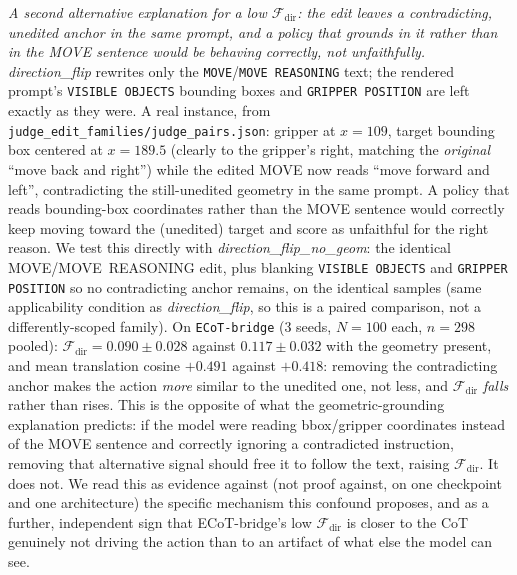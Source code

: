 \emph{A second alternative explanation for a low $\mathcal{F}_{\text{dir}}$: the edit leaves a contradicting, unedited anchor in the same prompt, and a policy that grounds in it rather than in the MOVE sentence would be behaving correctly, not unfaithfully.} \emph{direction\_flip} rewrites only the \texttt{MOVE}/\texttt{MOVE REASONING} text; the rendered prompt's \texttt{VISIBLE OBJECTS} bounding boxes and \texttt{GRIPPER POSITION} are left exactly as they were. A real instance, from \texttt{judge\_edit\_families/\allowbreak{}judge\_pairs.json}: gripper at $x{=}109$, target bounding box centered at $x{=}189.5$ (clearly to the gripper's right, matching the \emph{original} ``move back and right'') while the edited MOVE now reads ``move forward and left'', contradicting the still-unedited geometry in the same prompt. A policy that reads bounding-box coordinates rather than the MOVE sentence would correctly keep moving toward the (unedited) target and score as unfaithful for the right reason. We test this directly with \emph{direction\_flip\_no\_geom}: the identical MOVE/MOVE~REASONING edit, plus blanking \texttt{VISIBLE OBJECTS} and \texttt{GRIPPER POSITION} so no contradicting anchor remains, on the identical samples (same applicability condition as \emph{direction\_flip}, so this is a paired comparison, not a differently-scoped family). On \texttt{ECoT-bridge} (3 seeds, $N{=}100$ each, $n{=}298$ pooled): $\mathcal{F}_{\text{dir}} = 0.090 \pm 0.028$ against $0.117 \pm 0.032$ with the geometry present, and mean translation cosine $+0.491$ against $+0.418$: removing the contradicting anchor makes the action \emph{more} similar to the unedited one, not less, and $\mathcal{F}_{\text{dir}}$ \emph{falls} rather than rises. This is the opposite of what the geometric-grounding explanation predicts: if the model were reading bbox/gripper coordinates instead of the MOVE sentence and correctly ignoring a contradicted instruction, removing that alternative signal should free it to follow the text, raising $\mathcal{F}_{\text{dir}}$. It does not. We read this as evidence against (not proof against, on one checkpoint and one architecture) the specific mechanism this confound proposes, and as a further, independent sign that ECoT-bridge's low $\mathcal{F}_{\text{dir}}$ is closer to the CoT genuinely not driving the action than to an artifact of what else the model can see.

